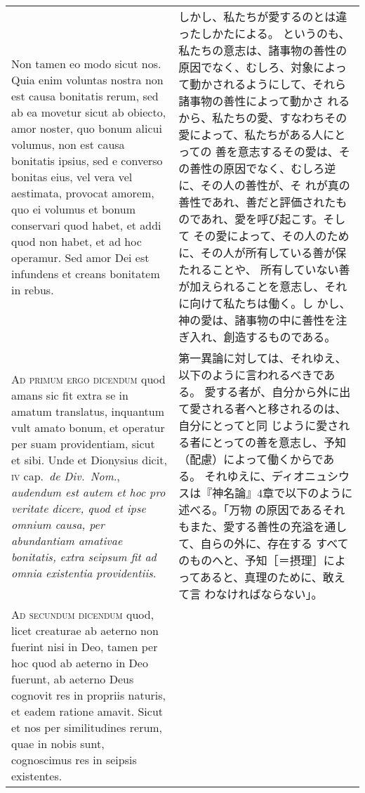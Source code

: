 \documentclass[10pt]{jsarticle} %
\begin{document}
\begin{longtable}{p{21em}p{21em}}
Non tamen eo modo sicut
nos. Quia enim voluntas nostra non est causa bonitatis rerum, sed ab ea
movetur sicut ab obiecto, amor noster, quo bonum alicui volumus, non est
causa bonitatis ipsius, sed e converso bonitas eius, vel vera vel
aestimata, provocat amorem, quo ei volumus et bonum conservari quod
habet, et addi quod non habet, et ad hoc operamur. Sed amor Dei est
infundens et creans bonitatem in rebus.


&

しかし、私たちが愛するのとは違ったしかたによる。
というのも、私たちの意志は、諸事物の善性の原因でなく、むしろ、対象によっ
 て動かされるようにして、それら諸事物の善性によって動かさ
 れるから、私たちの愛、すなわちその愛によって、私たちがある人にとっての
 善を意志するその愛は、その善性の原因でなく、むしろ逆に、その人の善性が、そ
 れが真の善性であれ、善だと評価されたものであれ、愛を呼び起こす。そして
 その愛によって、その人のために、その人が所有している善が保たれることや、
 所有していない善が加えられることを意志し、それに向けて私たちは働く。し
 かし、神の愛は、諸事物の中に善性を注ぎ入れ、創造するものである。




\\


{\scshape Ad primum ergo dicendum} quod amans sic fit
extra se in amatum translatus, inquantum vult amato bonum, et operatur
per suam providentiam, sicut et sibi. Unde et Dionysius dicit, {\scshape iv}
cap.~{\itshape de Div.~Nom}., {\itshape audendum est autem et hoc pro veritate dicere, quod
et ipse omnium causa, per abundantiam amativae bonitatis, extra seipsum
fit ad omnia existentia providentiis}.


&

第一異論に対しては、それゆえ、以下のように言われるべきである。
愛する者が、自分から外に出て愛される者へと移されるのは、自分にとってと同
 じように愛される者にとっての善を意志し、予知（配慮）によって働くからである。
それゆえに、ディオニュシウスは『神名論』4章で以下のように述べる。「万物
 の原因であるそれもまた、愛する善性の充溢を通して、自らの外に、存在する
 すべてのものへと、予知［＝摂理］によってあると、真理のために、敢えて言
 わなければならない」。


\\


{\scshape Ad secundum dicendum} quod, licet creaturae ab
aeterno non fuerint nisi in Deo, tamen per hoc quod ab aeterno in Deo
fuerunt, ab aeterno Deus cognovit res in propriis naturis, et eadem
ratione amavit. Sicut et nos per similitudines rerum, quae in nobis
sunt, cognoscimus res in seipsis existentes.



\end{longtable}
\end{document}
